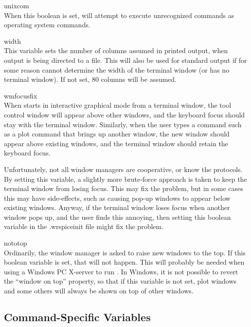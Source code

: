 \begin{description}
\item{\et unixcom}\\
When this boolean is set, {\WRspice} will attempt to execute unrecognized
commands as operating system commands.

\item{\et width}\\
This variable sets the number of columns assumed in printed output,
when output is being directed to a file.  This will also be used for
standard output if for some reason {\WRspice} cannot determine the
width of the terminal window (or has no terminal window).  If not set,
80 columns will be assumed.

\item{\et wmfocusfix}\\
When {\WRspice} starts in interactive graphical mode from a terminal
window, the tool control window will appear above other windows, and
the keyboard focus should stay with the terminal window.  Similarly,
when the user types a command such as a plot command that brings up
another window, the new window should appear above existing windows,
and the terminal window should retain the keyboard focus.

Unfortunately, not all window managers are cooperative, or know the
protocols.  By setting this variable, a slightly more brute-force
approach is taken to keep the terminal window from losing focus.  This
may fix the problem, but in some cases this may have side-effects,
such as causing pop-up windows to appear below existing windows. 
Anyway, if the terminal window loses focus when another window pops
up, and the user finds this annoying, then setting this boolean
variable in the {\vt .wrspiceinit} file might fix the problem.

\item{\et nototop}\\
Ordinarily, the window manager is asked to raise new windows to the
top.  If this boolean variable is set, that will not happen.  This
will probably be needed when using a Windows PC X-server to run
{\WRspice}.  In Windows, it is not possible to revert the ``window on
top'' property, so that if this variable is not set, plot windows and
some others will always be shown on top of other windows.

\end{description}

\subsection{Command-Specific Variables}

